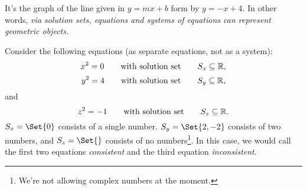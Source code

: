 	It's the graph of the line given in $y=mx+b$ form by $y=-x+4$. In other words, \emph{via solution sets, equations and systems
	of equations can represent geometric objects.}

%
%


	Consider the following equations (as separate equations, not as a system):
	\[
		x^2=0\qquad\text{with solution set}\qquad S_x\subseteq \mathbb{R},
	\]
	\[
		y^2=4\qquad\text{with solution set}\qquad S_y\subseteq \mathbb{R},
	\]
	and
	\[
		z^2=-1\qquad\text{with solution set}\qquad S_z\subseteq \mathbb{R}.
	\]
	$S_x=\Set{0}$ consists of a single number. $S_y=\Set{2,-2}$ consists of two numbers, and $S_z=\Set{}$ consists of no
	numbers\footnote{ We're not allowing complex numbers at the moment.}.
	In this case, we would call the first two equations \emph{consistent} and the third equation \emph{inconsistent}.

